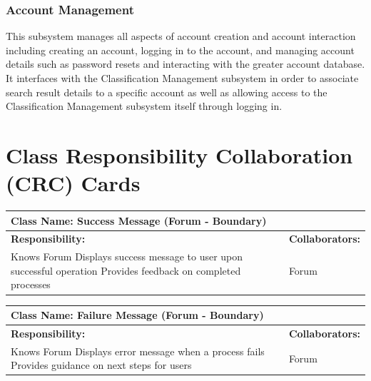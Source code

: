 \documentclass[]{article}
\begin{document}
\subsubsection{Account Management}
This subsystem manages all aspects of account creation and account interaction including creating an account, logging in to the account, and managing account details such as password resets and interacting with the greater account database. It interfaces with the Classification Management subsystem in order to associate search result details to a specific account as well as allowing access to the Classification Management subsystem itself through logging in.


	
\section{Class Responsibility Collaboration (CRC) Cards}
\label{sec:class_responsibility_collaboration_crc_cards}

	\begin{table}[H]
	    \centering
	    \begin{tabular}{|p{7cm}|p{7cm}|}
	    \hline 
	     \multicolumn{2}{|l|}{\textbf{Class Name: Success Message (Forum - Boundary)}} \\
	    \hline
	    \textbf{Responsibility:} & \textbf{Collaborators:} \\
	    \hline
	    Knows Forum \newline
	    Displays success message to user upon successful operation \newline
	    Provides feedback on completed processes & 		
	    Forum \\
	    \hline
	    \end{tabular}
	\end{table}
	
	\begin{table}[H]
	    \centering
	    \begin{tabular}{|p{7cm}|p{7cm}|}
	    \hline 
	     \multicolumn{2}{|l|}{\textbf{Class Name: Failure Message (Forum - Boundary)}} \\
	    \hline
	    \textbf{Responsibility:} & \textbf{Collaborators:} \\
	    \hline
	    Knows Forum \newline
	    Displays error message when a process fails \newline
	    Provides guidance on next steps for users & 		
	    Forum \\
	    \hline
	    \end{tabular}
	\end{table}
	
\end{document}
